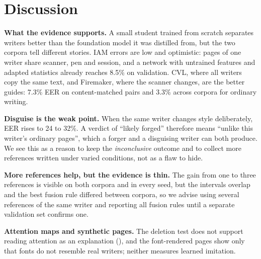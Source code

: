 \section{Discussion}
\label{sec:discussion}
\textbf{What the evidence supports.}
A small student trained from scratch separates writers better than the foundation model it was distilled from, but the two corpora tell different stories.
IAM errors are low and optimistic: pages of one writer share scanner, pen and session, and a network with untrained features and adapted statistics already reaches 8.5\% on validation.
CVL, where all writers copy the same text, and Firemaker, where the scanner changes, are the better guides: 7.3\% EER on content-matched pairs and 3.3\% across corpora for ordinary writing.

\textbf{Disguise is the weak point.}
When the same writer changes style deliberately, EER rises to 24 to 32\%.
A verdict of ``likely forged'' therefore means ``unlike this writer's ordinary pages'', which a forger and a disguising writer can both produce.
We see this as a reason to keep the \emph{inconclusive} outcome and to collect more references written under varied conditions, not as a flaw to hide.

\textbf{More references help, but the evidence is thin.}
The gain from one to three references is visible on both corpora and in every seed, but the intervals overlap and the best fusion rule differed between corpora, so we advise using several references of the same writer and reporting all fusion rules until a separate validation set confirms one.

\textbf{Attention maps and synthetic pages.}
The deletion test does not support reading attention as an explanation (), and the font-rendered pages show only that fonts do not resemble real writers; neither measures learned imitation.
